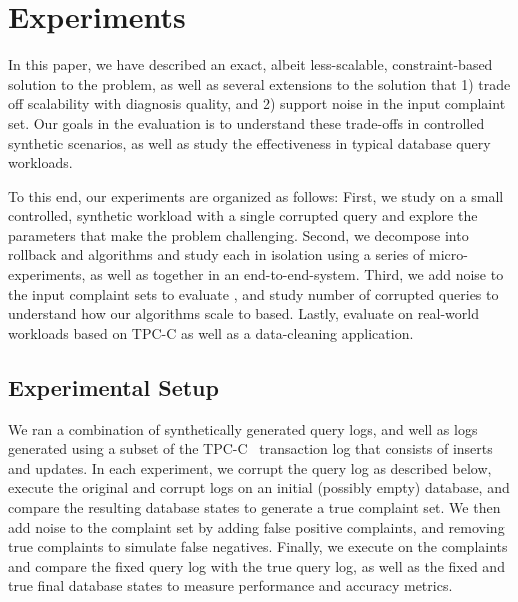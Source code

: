 %
%
%
%
%
\section{Experiments}

In this paper, we have described an exact, albeit less-scalable,
constraint-based solution to the \prob problem, as well as several
extensions to the solution that 1) trade off scalability with
diagnosis quality, and 2) support noise in the input complaint set.
Our goals in the evaluation is to understand these trade-offs in
controlled synthetic scenarios, as well as study the effectiveness
in typical database query workloads.

To this end, our experiments are organized as follows: First, we
study \exact on a small controlled, synthetic workload with a single
corrupted query and explore the parameters that make the problem
challenging.  Second, we decompose \exact into rollback and \qfix algorithms and study each
in isolation using a series of micro-experiments, as well as together in an end-to-end-system.  
Third, we add noise to the input complaint sets to evaluate \density, and study
number of corrupted queries to understand how our algorithms scale to 
based.  Lastly, evaluate on real-world workloads based on TPC-C as
well as a data-cleaning application.



%
%

\subsection{Experimental Setup}

We ran a combination of synthetically generated query logs, and
well as logs generated using a subset of the TPC-C~\cite{tpcc}
transaction log that consists of inserts and updates.  In each
experiment, we corrupt the query log as described below, execute
the original and corrupt logs on an initial (possibly empty) database,
and compare the resulting database states to generate a true complaint
set.  We then add noise to the complaint set by adding false positive
complaints, and removing true complaints to simulate false negatives.
Finally, we execute \sys on the complaints and compare the fixed
query log with the true query log, as well as the fixed and true
final database states to measure performance and accuracy metrics.

